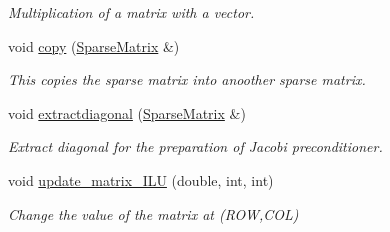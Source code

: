 \begin{DoxyCompactItemize}
\begin{DoxyCompactList}\small\item\em Multiplication of a matrix with a vector. \end{DoxyCompactList}\item 
void \hyperlink{class_sparse_matrix_a2c4defbcb8be6850ffffceb7c31f86ba}{copy} (\hyperlink{class_sparse_matrix}{Sparse\+Matrix} \&)
\begin{DoxyCompactList}\small\item\em This copies the sparse matrix into anoother sparse matrix. \end{DoxyCompactList}\item 
void \hyperlink{class_sparse_matrix_afb9d3a09f4b71ff1fcca81129b64de5f}{extractdiagonal} (\hyperlink{class_sparse_matrix}{Sparse\+Matrix} \&)
\begin{DoxyCompactList}\small\item\em Extract diagonal for the preparation of Jacobi preconditioner. \end{DoxyCompactList}\item 
void \hyperlink{class_sparse_matrix_aa772cb0ed69d4b4ceca72987f5cd4043}{update\+\_\+matrix\+\_\+\+I\+L\+U} (double, int, int)
\begin{DoxyCompactList}\small\item\em Change the value of the matrix at (R\+O\+W,C\+O\+L) \end{DoxyCompactList}\end{DoxyCompactItemize}
